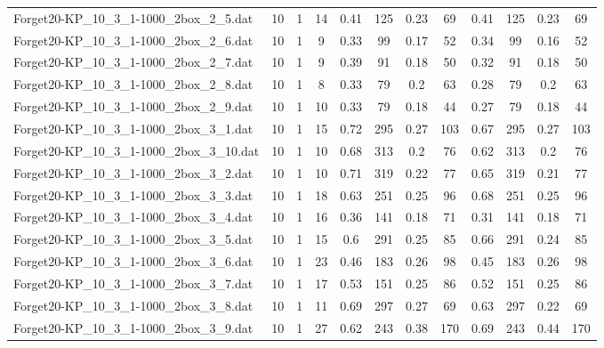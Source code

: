 \begin{sidewaystable}[!ht]
{\begin{tabular}{lccccccccccc}
Forget20-KP\_10\_3\_1-1000\_2box\_2\_5.dat & 10 & 1 & 14 & 0.41 & 125 &  \textcolor{blue2}{0.23} & 69 & 0.41 & 125 &  \textcolor{blue2}{0.23} & 69 \\
Forget20-KP\_10\_3\_1-1000\_2box\_2\_6.dat & 10 & 1 & 9 & 0.33 & 99 & 0.17 & 52 & 0.34 & 99 &  \textcolor{blue2}{0.16} & 52 \\
Forget20-KP\_10\_3\_1-1000\_2box\_2\_7.dat & 10 & 1 & 9 & 0.39 & 91 &  \textcolor{blue2}{0.18} & 50 & 0.32 & 91 &  \textcolor{blue2}{0.18} & 50 \\
Forget20-KP\_10\_3\_1-1000\_2box\_2\_8.dat & 10 & 1 & 8 & 0.33 & 79 &  \textcolor{blue2}{0.2} & 63 & 0.28 & 79 &  \textcolor{blue2}{0.2} & 63 \\
Forget20-KP\_10\_3\_1-1000\_2box\_2\_9.dat & 10 & 1 & 10 & 0.33 & 79 &  \textcolor{blue2}{0.18} & 44 & 0.27 & 79 &  \textcolor{blue2}{0.18} & 44 \\
Forget20-KP\_10\_3\_1-1000\_2box\_3\_1.dat & 10 & 1 & 15 & 0.72 & 295 &  \textcolor{blue2}{0.27} & 103 & 0.67 & 295 &  \textcolor{blue2}{0.27} & 103 \\
Forget20-KP\_10\_3\_1-1000\_2box\_3\_10.dat & 10 & 1 & 10 & 0.68 & 313 &  \textcolor{blue2}{0.2} & 76 & 0.62 & 313 &  \textcolor{blue2}{0.2} & 76 \\
Forget20-KP\_10\_3\_1-1000\_2box\_3\_2.dat & 10 & 1 & 10 & 0.71 & 319 & 0.22 & 77 & 0.65 & 319 &  \textcolor{blue2}{0.21} & 77 \\
Forget20-KP\_10\_3\_1-1000\_2box\_3\_3.dat & 10 & 1 & 18 & 0.63 & 251 & 0.25 & 96 & 0.68 & 251 & 0.25 & 96 \\
Forget20-KP\_10\_3\_1-1000\_2box\_3\_4.dat & 10 & 1 & 16 & 0.36 & 141 &  \textcolor{blue2}{0.18} & 71 & 0.31 & 141 &  \textcolor{blue2}{0.18} & 71 \\
Forget20-KP\_10\_3\_1-1000\_2box\_3\_5.dat & 10 & 1 & 15 & 0.6 & 291 & 0.25 & 85 & 0.66 & 291 &  \textcolor{blue2}{0.24} & 85 \\
Forget20-KP\_10\_3\_1-1000\_2box\_3\_6.dat & 10 & 1 & 23 & 0.46 & 183 &  \textcolor{blue2}{0.26} & 98 & 0.45 & 183 &  \textcolor{blue2}{0.26} & 98 \\
Forget20-KP\_10\_3\_1-1000\_2box\_3\_7.dat & 10 & 1 & 17 & 0.53 & 151 &  \textcolor{blue2}{0.25} & 86 & 0.52 & 151 &  \textcolor{blue2}{0.25} & 86 \\
Forget20-KP\_10\_3\_1-1000\_2box\_3\_8.dat & 10 & 1 & 11 & 0.69 & 297 & 0.27 & 69 & 0.63 & 297 &  \textcolor{blue2}{0.22} & 69 \\
Forget20-KP\_10\_3\_1-1000\_2box\_3\_9.dat & 10 & 1 & 27 & 0.62 & 243 &  \textcolor{blue2}{0.38} & 170 & 0.69 & 243 & 0.44 & 170 \\

\end{tabular}}
\end{sidewaystable}
